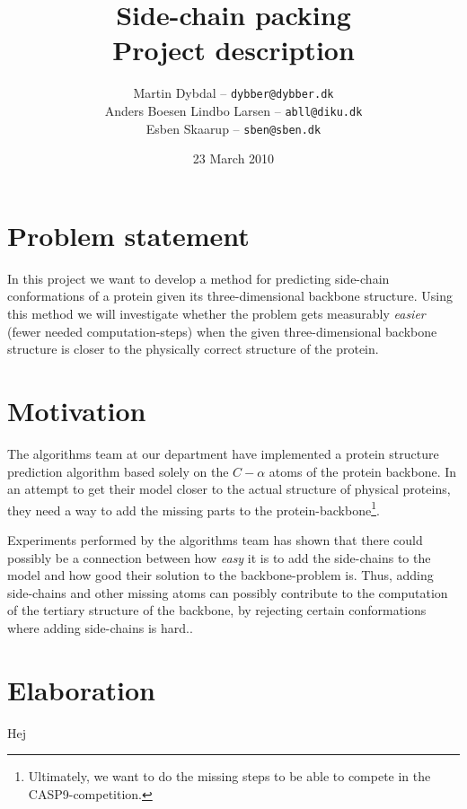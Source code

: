 \documentclass[10pt,a4paper,final,oneside,openany,article]{memoir}
\title{
  Side-chain packing \\
  \small{Project description}
}
\author{
	Martin Dybdal -- \texttt{dybber@dybber.dk}\\
	Anders Boesen Lindbo Larsen -- \texttt{abll@diku.dk} \\
    Esben Skaarup -- \texttt{sben@sben.dk}
}
\date{23 March 2010}
\begin{document}
\maketitle

\section{Problem statement}
In this project we want to develop a method for predicting side-chain
conformations of a protein given its three-dimensional backbone
structure. Using this method we will investigate whether the
problem gets measurably \textit{easier} (fewer needed
computation-steps) when the given three-dimensional backbone structure
is closer to the physically correct structure of the protein.

\section{Motivation}
The algorithms team at our department have implemented a protein
structure prediction algorithm based solely on the $C-\alpha$ atoms of
the protein backbone. In an attempt to get their model closer to the
actual structure of physical proteins, they need a way to add the
missing parts to the protein-backbone\footnote{Ultimately, we want to
  do the missing steps to be able to compete in the
  CASP9-competition.}.

Experiments performed by the algorithms team has shown that there
could possibly be a connection between how \textit{easy} it is to add
the side-chains to the model and how good their solution to the
backbone-problem is. Thus, adding side-chains and other missing atoms
can possibly contribute to the computation of the tertiary structure
of the backbone, by rejecting certain conformations where adding
side-chains is hard..

\section{Elaboration}

Hej \cite{branden} 

\begin{figure}
  \centering
\end{figure}
\end{document}
